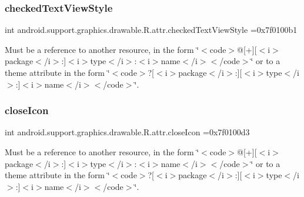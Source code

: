 \subsubsection{\texorpdfstring{checked\+Text\+View\+Style}{checkedTextViewStyle}}
{\footnotesize\ttfamily int android.\+support.\+graphics.\+drawable.\+R.\+attr.\+checked\+Text\+View\+Style =0x7f0100b1\hspace{0.3cm}{\ttfamily [static]}}

Must be a reference to another resource, in the form \char`\"{}$<$code$>$@\mbox{[}+\mbox{]}\mbox{[}$<$i$>$package$<$/i$>$\+:\mbox{]}$<$i$>$type$<$/i$>$\+:$<$i$>$name$<$/i$>$$<$/code$>$\char`\"{} or to a theme attribute in the form \char`\"{}$<$code$>$?\mbox{[}$<$i$>$package$<$/i$>$\+:\mbox{]}\mbox{[}$<$i$>$type$<$/i$>$\+:\mbox{]}$<$i$>$name$<$/i$>$$<$/code$>$\char`\"{}. \mbox{\label{classandroid_1_1support_1_1graphics_1_1drawable_1_1R_1_1attr_a379ac22fa60c32b8bf92d28176b37183}} 
\subsubsection{\texorpdfstring{close\+Icon}{closeIcon}}
{\footnotesize\ttfamily int android.\+support.\+graphics.\+drawable.\+R.\+attr.\+close\+Icon =0x7f0100d3\hspace{0.3cm}{\ttfamily [static]}}

Must be a reference to another resource, in the form \char`\"{}$<$code$>$@\mbox{[}+\mbox{]}\mbox{[}$<$i$>$package$<$/i$>$\+:\mbox{]}$<$i$>$type$<$/i$>$\+:$<$i$>$name$<$/i$>$$<$/code$>$\char`\"{} or to a theme attribute in the form \char`\"{}$<$code$>$?\mbox{[}$<$i$>$package$<$/i$>$\+:\mbox{]}\mbox{[}$<$i$>$type$<$/i$>$\+:\mbox{]}$<$i$>$name$<$/i$>$$<$/code$>$\char`\"{}. \mbox{\label{classandroid_1_1support_1_1graphics_1_1drawable_1_1R_1_1attr_ac238e30f34ad91808aab3d2ef338b4de}} 
